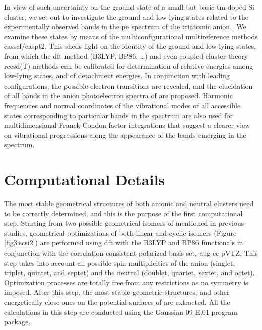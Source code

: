 \begin{refsection}
In view of such uncertainty on the ground state of a small but basic \acrshort{tm} doped Si cluster, we set out to investigate the ground and low-lying states related to the experimentally observed bands in the \acrshort{pe} spectrum of the triatomic anion . We examine these states by means of the multiconfigurational multireference methods \acrshort{casscf}/\acrshort{caspt2}. This sheds light on the identity of the ground and low-lying states, from which the \acrshort{dft}  method (B3LYP, BP86, \ldots) and even coupled-cluster theory \acrshort{rccsd}(T) methods can be calibrated for determination of relative energies among low-lying states, and of detachment energies. In conjunction with leading configurations, the possible electron transitions are revealed, and the elucidation of all bands in the anion photoelectron spectra of  are proposed. Harmonic frequencies and normal coordinates of the vibrational modes of all accessible states corresponding to particular bands in the spectrum are also used for multidimensional Franck-Condon factor integrations that suggest a clearer view on vibrational progressions along the appearance of the bands emerging in the spectrum.



\section{Computational Details}


The most stable geometrical structures of both anionic and neutral clusters need to be correctly determined, and this is the purpose of the first computational step. Starting from two possible geometrical isomers of  mentioned in previous studies,\cite{c3:14, c3:16} geometrical optimizations of both linear and cyclic isomers (Figure \ref{fig3:scsi2}) are performed using \acrshort{dft}  with the B3LYP\cite{c3:33, c3:34, c3:35} and BP86\cite{c3:34, c3:36} functionals in conjunction with the correlation-consistent polarized basis set, aug-cc-pVTZ.\cite{c3:37, c3:38} This step takes into account all possible spin multiplicities of the anion (singlet, triplet, quintet, and septet) and the neutral (doublet, quartet, sextet, and octet). Optimization processes are totally free from any restrictions as no symmetry is imposed. After this step, the most stable geometric structures, and other energetically close ones on the potential surfaces of  are extracted. All the calculations in this step are conducted using the Gaussian 09 E.01 program package.\cite{c3:39}
 

\end{refsection}
